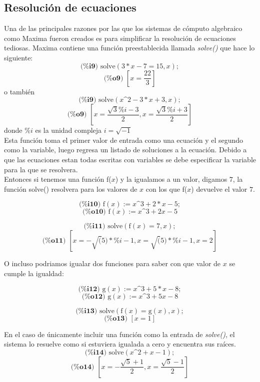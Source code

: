 \documentclass{article}
\begin{document}
\subsection{Resolución de ecuaciones}

Una de las principales razones por las que los sistemas de cómputo algebraico como Maxima fueron creados es para simplificar la resolución de ecuaciones tediosas. Maxima contiene una función preestablecida llamada \textit{solve()} que hace lo siguiente:
\[ \textbf{(\%i9) }\text{solve}(3*x-7=15,x); \]
\[ \textbf{(\%o9) }[x=\frac{22}{3}] \]
o también
\[ \textbf{(\%i9) }\text{solve}(x\text{\textasciicircum}2-3*x+3,x); \]
\[ \textbf{(\%o9) }[x=\frac{\sqrt{3}\%i-3}{2},x=\frac{\sqrt{3}\%i+3}{2}] \]
donde $\%i$ es la unidad compleja $i=\sqrt{-1}$
~\\

Esta función toma el primer valor de entrada como una ecuación y el segundo como la variable, luego regresa un listado de soluciones a la ecuación. Debido a que las ecuaciones estan todas escritas con variables se debe especificar la variable para la que se resolvera.
~\\

Entonces si tenemos una función f($x$) y la igualamos a un valor, digamos $7$, la función solve() resolvera para los valores de $x$ con los que f($x$) devuelve el valor $7$.

\[ \textbf{(\%i10) }\text{f}(x):=x\text{\textasciicircum}3+2*x-5; \]
\[ \textbf{(\%o10) }\text{f}(x):=x\text{\textasciicircum}3+2x-5 \]

\[ \textbf{(\%i11) }\text{solve}(\text{f}(x)=7,x); \]
\[ \textbf{(\%o11) }[x=-\sqrt(5)*\%i-1,x=\sqrt(5)*\%i-1,x=2] \]

O incluso podriamos igualar dos funciones para saber con que valor de $x$ se cumple la igualdad:

\[ \textbf{(\%i12) }\text{g}(x):=x\text{\textasciicircum}3+5*x-8; \]
\[ \textbf{(\%o12) }\text{g}(x):=x\text{\textasciicircum}3+5x-8 \]

\[ \textbf{(\%i13) }\text{solve}(\text{f}(x)=\text{g}(x),x); \]
\[ \textbf{(\%o13) }[x=1] \]

En el caso de únicamente incluir una función como la entrada de \textit{solve()}, el sistema lo resuelve como si estuviera igualada a cero y encuentra sus raíces.
~\\

\[ \textbf{(\%i14) }\text{solve}(x\text{\textasciicircum}2+x-1); \]
\[ \textbf{(\%o14) }[x=-\frac{\sqrt{5}+1}{2},x=\frac{\sqrt{5}-1}{2}] \]
\end{document}
